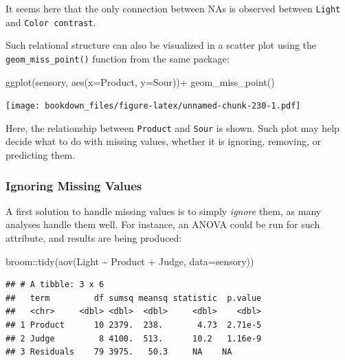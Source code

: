 \documentclass[
]{krantz}
\makeatletter
\newenvironment{Shaded}{\begin{snugshade}}{\end{snugshade}}
\newcommand{\AttributeTok}[1]{\textcolor[rgb]{0.61,0.61,0.61}{#1}}
\newcommand{\FunctionTok}[1]{\textcolor[rgb]{0,0,0}{#1}}
\newcommand{\NormalTok}[1]{#1}
\newcommand{\SpecialCharTok}[1]{\textcolor[rgb]{0,0,0}{#1}}
\newenvironment{kframe}{%
\medskip{}
\setlength{\fboxsep}{.8em}
 \def\at@end@of@kframe{}%
 \ifinner\ifhmode%
  \def\at@end@of@kframe{\end{minipage}}%
  \begin{minipage}{\columnwidth}%
 \fi\fi%
 \def\FrameCommand##1{\hskip\@totalleftmargin \hskip-\fboxsep
 \colorbox{shadecolor}{##1}\hskip-\fboxsep
     \hskip-\linewidth \hskip-\@totalleftmargin \hskip\columnwidth}%
 \MakeFramed {\advance\hsize-\width
   \@totalleftmargin\z@ \linewidth\hsize
   \@setminipage}}%
 {\par\unskip\endMakeFramed%
 \at@end@of@kframe}
\renewenvironment{Shaded}{\begin{kframe}}{\end{kframe}}
\makeatother
\begin{document}
It seems here that the only connection between NAs is observed between \texttt{Light} and \texttt{Color\ contrast}.

Such relational structure can also be visualized in a scatter plot using the \texttt{geom\_miss\_point()} function from the same package:

\begin{Shaded}
\begin{Highlighting}[]
\FunctionTok{ggplot}\NormalTok{(sensory, }\FunctionTok{aes}\NormalTok{(}\AttributeTok{x=}\NormalTok{Product, }\AttributeTok{y=}\NormalTok{Sour))}\SpecialCharTok{+}
  \FunctionTok{geom\_miss\_point}\NormalTok{()}
\end{Highlighting}
\end{Shaded}

\texttt{[image: bookdown\_files/figure-latex/unnamed-chunk-230-1.pdf]}

Here, the relationship between \texttt{Product} and \texttt{Sour} is shown. Such plot may help decide what to do with missing values, whether it is ignoring, removing, or predicting them.

\hypertarget{ignoring-missing-values}{%
\subsubsection{Ignoring Missing Values}\label{ignoring-missing-values}}

A first solution to handle missing values is to simply \emph{ignore} them, as many analyses handle them well. For instance, an ANOVA could be run for such attribute, and results are being produced:

\begin{Shaded}
\begin{Highlighting}[]
\NormalTok{broom}\SpecialCharTok{::}\FunctionTok{tidy}\NormalTok{(}\FunctionTok{aov}\NormalTok{(Light }\SpecialCharTok{\textasciitilde{}}\NormalTok{ Product }\SpecialCharTok{+}\NormalTok{ Judge, }\AttributeTok{data=}\NormalTok{sensory))}
\end{Highlighting}
\end{Shaded}

\begin{verbatim}
## # A tibble: 3 x 6
##   term         df sumsq meansq statistic  p.value
##   <chr>     <dbl> <dbl>  <dbl>     <dbl>    <dbl>
## 1 Product      10 2379.  238.       4.73  2.71e-5
## 2 Judge         8 4100.  513.      10.2   1.16e-9
## 3 Residuals    79 3975.   50.3     NA    NA
\end{verbatim}
\end{document}
